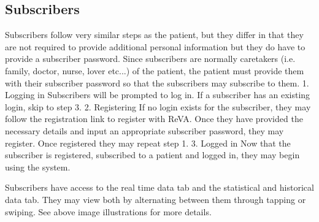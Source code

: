 \subsection{Subscribers} %
Subscribers follow very similar steps as the patient, but they differ in that they are not required to provide additional personal information but they do have to provide a subscriber password. Since subscribers are normally caretakers (i.e. family, doctor, nurse, lover etc...) of the patient, the patient must provide them with their subscriber password so that the subscribers may subscribe to them. 
	1. Logging in
		Subscribers will be prompted to log in. If a subscriber has an existing login, skip to step 3. 
	2. Registering 
		If no login exists for the subscriber, they may follow the registration link to register with ReVA. Once they have 			provided the necessary details and input an appropriate subscriber password, they may register. Once registered they may 		 repeat step 1. 
	3. Logged in
		Now that the subscriber is registered, subscribed to a patient and logged in, they may begin using the system. 
		
	Subscribers have access to the real time data tab and the statistical and historical data tab. They may view both by alternating between them through tapping or swiping. See above image illustrations for more details. 

